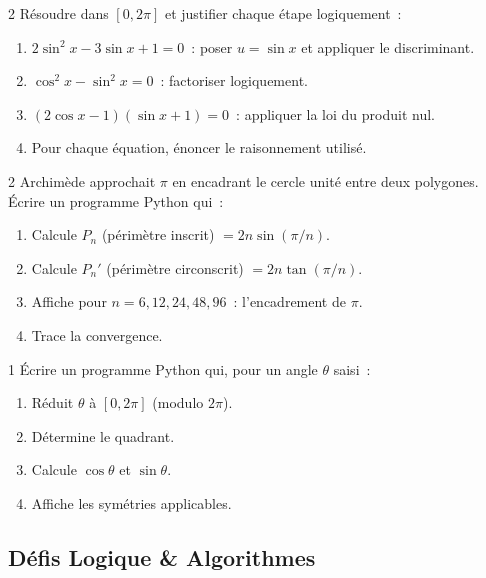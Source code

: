 \begin{bilan}
\begin{probleme}{2}
R\'esoudre dans $[0,2\pi]$ et justifier chaque \'etape logiquement~:
\begin{enumerate}
  \item $2\sin^2x-3\sin x+1=0$~: poser $u=\sin x$ et appliquer le discriminant.
  \item $\cos^2x-\sin^2x=0$~: factoriser logiquement.
  \item $(2\cos x-1)(\sin x+1)=0$~: appliquer la loi du produit nul.
  \item Pour chaque \'equation, \'enoncer le raisonnement utilis\'e.
\end{enumerate}
\end{probleme}

\begin{probleme}{2}
Archim\`ede approchait $\pi$ en encadrant le cercle unit\'e entre deux polygones.
\'Ecrire un programme Python qui~:
\begin{enumerate}
  \item Calcule $P_n$ (p\'erim\`etre inscrit) $= 2n\sin(\pi/n)$.
  \item Calcule $P_n'$ (p\'erim\`etre circonscrit) $= 2n\tan(\pi/n)$.
  \item Affiche pour $n=6,12,24,48,96$~: l'encadrement de $\pi$.
  \item Trace la convergence.
\end{enumerate}
\end{probleme}

\begin{probleme}{1}
\'Ecrire un programme Python qui, pour un angle $\theta$ saisi~:
\begin{enumerate}
  \item R\'eduit $\theta$ \`a $[0,2\pi]$ (modulo $2\pi$).
  \item D\'etermine le quadrant.
  \item Calcule $\cos\theta$ et $\sin\theta$.
  \item Affiche les sym\'etries applicables.
\end{enumerate}
\end{probleme}

\subsection*{D\'efis Logique \& Algorithmes}


\end{bilan}
